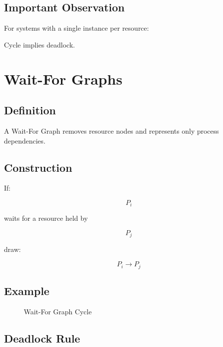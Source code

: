 \subsection{Important Observation}

For systems with a single instance per resource:

Cycle implies deadlock.

\section{Wait-For Graphs}

\subsection{Definition}

A Wait-For Graph removes resource nodes and represents only process dependencies.

\subsection{Construction}

If:

\[
P_i
\]

waits for a resource held by

\[
P_j
\]

draw:

\[
P_i \rightarrow P_j
\]

\subsection{Example}

\begin{figure}[H]
\centering
{}
\caption{Wait-For Graph Cycle}
\end{figure}

\subsection{Deadlock Rule}

